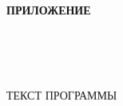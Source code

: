 \begin{ESKDtitlePage}
  \begin{flushright}
    \textbf{ПРИЛОЖЕНИЕ~\envPracticePrilLetter} \enspace\enspace
  \end{flushright}

  \begin{center}
    \envPracticeEducation\\
    \envPracticeUniversity\\
    \envPracticeFaculty\\
    \envPracticeCathedra
  \end{center}

  \vfill

  \begin{center}
    ТЕКСТ ПРОГРАММЫ
  \end{center}

  \vfill

  

  \vfill

  \begin{center}
    \envPracticeCity~\ESKDtheYear
  \end{center}
\end{ESKDtitlePage}
